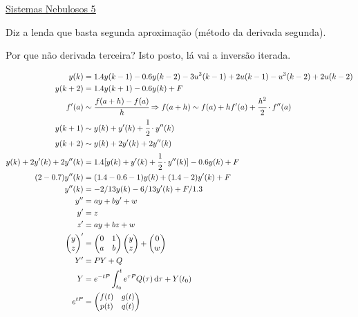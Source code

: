 \documentclass[12pt]{article}
\begin{document}
\Large

\begin{center}
\href{https://www.youtube.com/watch?v=2E0TYW42x1c}{\color{blue}\underline{Sistemas Nebulosos 5}}
\end{center}

\normalsize

Diz a lenda que basta segunda aproxima\c{c}\~ao (m\'etodo da derivada segunda).

Por que n\~ao derivada terceira? Isto posto, l\'a vai a invers\~ao iterada.

\begin{align}
y(k) &= 1.4 y(k-1) - 0.6 y(k-2) - 3 u^3(k -1) + 2u(k-1) - u^3(k-2) + 2u(k-2) \\
y(k+2) &= 1.4y(k+1) - 0.6y(k) + F \\
f'(a) &\sim \cfrac{f(a + h) - f(a)}{h} \Rightarrow f(a + h) \sim f(a) + h f'(a) + \cfrac{h^2}{2}\cdot f''(a) \\
y(k + 1) &\sim y(k) + y'(k) + \cfrac{1}{2}\cdot y''(k) \\
y(k + 2) &\sim y(k) + 2 y'(k) + 2 y''(k) \\
y(k) + 2 y'(k) + 2 y''(k) &= 1.4 [y(k) + y'(k) + \cfrac{1}{2}\cdot y''(k)] - 0.6y(k) + F \\
(2 - 0.7) y''(k) &= (1.4 - 0.6 - 1) y(k) + (1.4 - 2) y'(k) + F \\
y''(k) &=  - 2/13 y(k) - 6/13 y'(k) + F/1.3 \\
y'' &=  a y + b y' + w \\
 y' &= z \\
 z' &= ay + bz + w \\
 \begin{pmatrix} y \\ z \end{pmatrix}' &= \begin{pmatrix} 0 & 1 \\ a & b \end{pmatrix}\begin{pmatrix} y \\ z \end{pmatrix} + \begin{pmatrix} 0 \\ w \end{pmatrix} \\
 Y' &= P Y + Q \\
 Y &= e^{-tP} \int_{t_0}^t e^{\tau P} Q(\tau)\, \mathrm{d}\tau + Y(t_0) \\
e^{tP} &= \begin{pmatrix} f(t) & g(t) \\ p(t) & q(t) \end{pmatrix} \\

\end{align}
\end{document}
